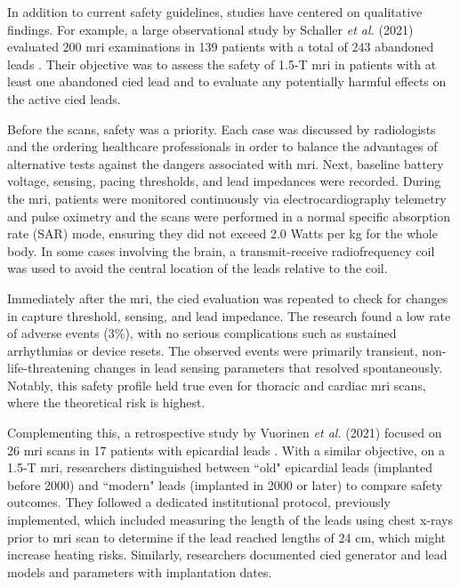 In addition to current safety guidelines, studies have centered on qualitative findings. For example, a large observational study by Schaller \textit{et al.} (2021) evaluated 200 \gls{mri} examinations in 139 patients with a total of 243 abandoned leads \cite{schaller2021}. Their objective was to assess the safety of 1.5-T \gls{mri} in patients with at least one abandoned \gls{cied} lead and to evaluate any potentially harmful effects on the active \gls{cied} leads. 

Before the scans, safety was a priority. Each case was discussed by radiologists and the ordering healthcare professionals in order to balance the advantages of alternative tests against the dangers associated with \gls{mri}. Next, baseline battery voltage, sensing, pacing thresholds, and lead impedances were recorded. During the \gls{mri}, patients were monitored continuously via electrocardiography telemetry and pulse oximetry and the scans were performed in a normal specific absorption rate (SAR) mode, ensuring they did not exceed 2.0 Watts per kg for the whole body. In some cases involving the brain, a transmit-receive radiofrequency coil was used to avoid the central location of the leads relative to the coil. 

Immediately after the \gls{mri}, the \gls{cied} evaluation was repeated to check for changes in capture threshold, sensing, and lead impedance. The research found a low rate of adverse events (3\%), with no serious complications such as sustained arrhythmias or device resets. The observed events were primarily transient, non-life-threatening changes in lead sensing parameters that resolved spontaneously. Notably, this safety profile held true even for thoracic and cardiac \gls{mri} scans, where the theoretical risk is highest.



Complementing this, a retrospective study by Vuorinen \textit{et al.} (2021) focused on 26 \gls{mri} scans in 17 patients with epicardial leads \cite{vuorinen2021}. With a similar objective, on a 1.5-T \gls{mri}, researchers distinguished between ``old" epicardial leads (implanted before 2000) and ``modern" leads (implanted in 2000 or later) to compare safety outcomes. They followed a dedicated institutional protocol, previously implemented, which included measuring the length of the leads using chest x-rays prior to \gls{mri} scan to determine if the lead reached lengths of 24 cm, which might increase heating risks. Similarly, researchers documented \gls{cied} generator and lead models and parameters with implantation dates.

